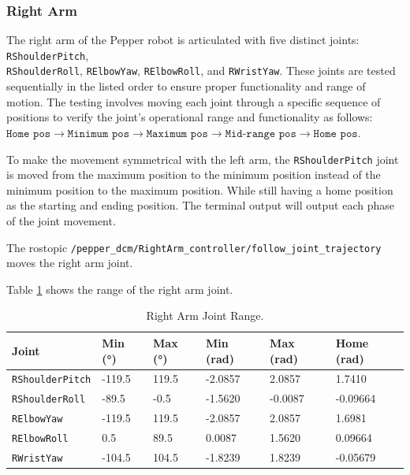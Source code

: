 \documentclass{CSSRforAfrica}
\begin{document}
\subsubsection*{Right Arm}
The right arm of the Pepper robot is articulated with five distinct joints: \texttt{RShoulderPitch},\\ 
\texttt{RShoulderRoll}, \texttt{RElbowYaw}, \texttt{RElbowRoll}, and
\texttt{RWristYaw}. These joints are tested sequentially in the listed order to ensure proper functionality and range of motion. The testing involves moving each joint 
through a specific sequence of positions to verify the joint's operational range and functionality as follows:\\
$ \texttt{Home pos} \rightarrow \texttt{Minimum pos} \rightarrow \texttt{Maximum pos} \rightarrow \texttt{Mid-range pos} \rightarrow \texttt{Home pos}$.

To make the movement symmetrical with the left arm, the \texttt{RShoulderPitch} joint is moved from the maximum position to the minimum position instead of the minimum position to the maximum position. While still having a home position as the starting and ending position. The terminal output will output each phase of the joint movement.

The rostopic \texttt{/pepper\_dcm/RightArm\_controller/follow\_joint\_trajectory} moves the right arm joint.

Table \ref{tab:right_arm_joint_range} shows the range of the right arm joint.

\begin{longtable}[c]{|l|l|l|l|l|l|} 
    \caption{Right Arm Joint Range.\cite{PepperJoints}} \label{tab:right_arm_joint_range}\\
    \hline
    \rowcolor{gray!30}
    \textbf{Joint} & \textbf{Min (°)} & \textbf{Max (°)} & \textbf{Min (rad)} & \textbf{Max (rad)}  & \textbf{Home (rad)} \\ \hline
    \endhead %
    
    \texttt{RShoulderPitch} & -119.5 & 119.5 & -2.0857 & 2.0857 & 1.7410 \\ \hline
    \texttt{RShoulderRoll} & -89.5 & -0.5 & -1.5620 & -0.0087 & -0.09664 \\ \hline
    \texttt{RElbowYaw} & -119.5 & 119.5 & -2.0857 & 2.0857 & 1.6981 \\ \hline
    \texttt{RElbowRoll} & 0.5 & 89.5 & 0.0087 & 1.5620 & 0.09664 \\ \hline
    \texttt{RWristYaw} & -104.5 & 104.5 & -1.8239 & 1.8239 & -0.05679 \\ \hline

\end{longtable}
\end{document}
